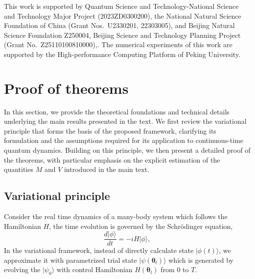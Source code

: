 \documentclass[twocolumn,
pra,aps,superscriptaddress,showpacs,amsmath,amssymb]{revtex4-2}
\begin{document}
\begin{acknowledgments}
This work is supported by Quantum Science and Technology-National Science and Technology Major Project (2023ZD0300200), the National Natural Science Foundation of China (Grant Nos.~U2330201, 22303005), and Beijing Natural Science Foundation Z250004, 
Beijing Science and Technology Planning Project (Grant No.~Z25110100810000),. The numerical experiments of this work are supported by the High-performance Computing Platform of Peking University.
\end{acknowledgments}




\clearpage
\newpage
\onecolumngrid
\appendix


\section{Proof of theorems}\label{sec:proof}
In  this section, we provide the theoretical foundations and technical details underlying the main results presented in the text. We first review the variational principle that forms the basis of the proposed framework, clarifying its formulation and the assumptions required for its application to continuous-time quantum dynamics. Building on this principle, we then present a detailed proof of the theorems, with particular emphasis on the explicit estimation of the quantities $M$ and $V$ introduced in the main text.

\subsection{Variational principle}
Consider the real time dynamics of a many-body system which follows the Hamiltonian $H$, the time evolution is governed by the Schrödinger equation,
\begin{equation}
\frac{d|\phi\rangle}{dt}=-iH|\phi\rangle,
\end{equation}
In the variational framework, instead of directly calculate state $|\phi(t)\rangle$, we approximate it with parametrized trial state $|\psi(\bm{\theta}_t)\rangle$ which is generated by evolving the $|\psi_0\rangle$ with control Hamiltonian $H(\bm{\theta}_t)$ from $0$ to $T$.
\end{document}
